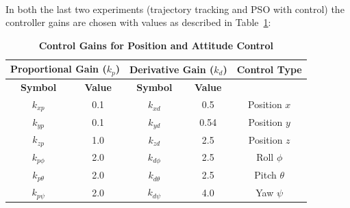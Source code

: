 \noindent\\
In both the last two experiments (trajectory tracking and PSO with
control) the controller gains are chosen with values as
described in Table~\ref{tab:control_gains}:
\begin{table}[h!]
\centering
\caption{\textbf{Control Gains for Position and Attitude Control}}
\begin{tabular}{c c | c c | c}
\hline\hline
\multicolumn{2}{c|}{\textbf{Proportional Gain (\(k_p\))}} & \multicolumn{2}{c|}{\textbf{Derivative Gain (\(k_d\))}} & \textbf{Control Type} \\ \hline
\textbf{Symbol}       & \textbf{Value}       & \textbf{Symbol}       & \textbf{Value}       &                      \\ \hline\hline
\(k_{xp}\)           & 0.1                 & \(k_{xd}\)           & 0.5                 & Position \(x\)       \\
\(k_{yp}\)           & 0.1                 & \(k_{yd}\)           & 0.54                & Position \(y\)       \\
\(k_{zp}\)           & 1.0                 & \(k_{zd}\)           & 2.5                 & Position \(z\)       \\ \hline
\(k_{p\phi}\)        & 2.0                 & \(k_{d\phi}\)       & 2.5                 & Roll \(\phi\)        \\
\(k_{p\theta}\)      & 2.0                 & \(k_{d\theta}\)     & 2.5                 & Pitch \(\theta\)     \\
\(k_{p\psi}\)        & 2.0                 & \(k_{d\psi}\)       & 4.0                 & Yaw \(\psi\)         \\
\hline\hline
\end{tabular}
\label{tab:control_gains}
\end{table}
    
